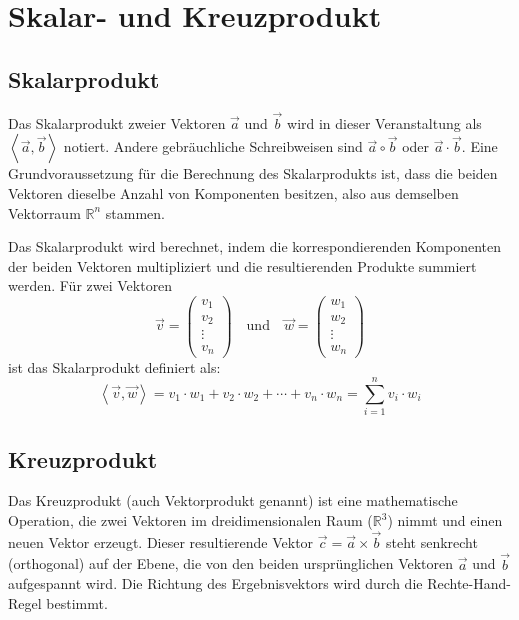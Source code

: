 \chapter{Skalar- und Kreuzprodukt}

\section{Skalarprodukt}

Das Skalarprodukt zweier Vektoren \(\vec{a}\) und \(\vec{b}\) wird in dieser Veranstaltung als \(\left\langle \vec{a}, \vec{b} \right\rangle\) notiert. Andere gebräuchliche Schreibweisen sind \(\vec{a} \circ \vec{b}\) oder \(\vec{a} \cdot \vec{b}\). Eine Grundvoraussetzung für die Berechnung des Skalarprodukts ist, dass die beiden Vektoren dieselbe Anzahl von Komponenten besitzen, also aus demselben Vektorraum \(\mathbb{R}^n\) stammen.

Das Skalarprodukt wird berechnet, indem die korrespondierenden Komponenten der beiden Vektoren multipliziert und die resultierenden Produkte summiert werden. Für zwei Vektoren
\[ \vec{v} = \begin{pmatrix} v_1 \\ v_2 \\ \vdots \\ v_n \end{pmatrix} \quad \text{und} \quad \vec{w} = \begin{pmatrix} w_1 \\ w_2 \\ \vdots \\ w_n \end{pmatrix} \]
ist das Skalarprodukt definiert als:
\[ \left\langle \vec{v}, \vec{w} \right\rangle = v_1 \cdot w_1 + v_2 \cdot w_2 + \cdots + v_n \cdot w_n = \sum_{i=1}^{n} v_i \cdot w_i \]

\section{Kreuzprodukt}

Das Kreuzprodukt (auch Vektorprodukt genannt) ist eine mathematische Operation, die zwei Vektoren im dreidimensionalen Raum (\(\mathbb{R}^3\)) nimmt und einen neuen Vektor erzeugt. Dieser resultierende Vektor \(\vec{c} = \vec{a} \times \vec{b}\) steht senkrecht (orthogonal) auf der Ebene, die von den beiden ursprünglichen Vektoren \(\vec{a}\) und \(\vec{b}\) aufgespannt wird. Die Richtung des Ergebnisvektors wird durch die Rechte-Hand-Regel bestimmt.

